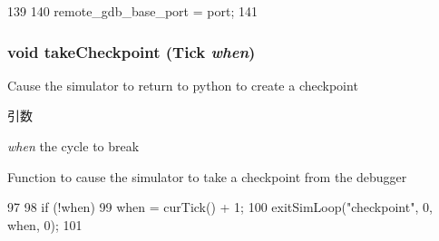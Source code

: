 \begin{DoxyCode}
139 {
140     remote_gdb_base_port = port;
141 }
\end{DoxyCode}
\hypertarget{sim_2debug_8hh_a8e601d5e7c5df79b432e340f3af19583}{
\subsubsection[{takeCheckpoint}]{\setlength{\rightskip}{0pt plus 5cm}void takeCheckpoint ({\bf Tick} {\em when})}}
\label{sim_2debug_8hh_a8e601d5e7c5df79b432e340f3af19583}
Cause the simulator to return to python to create a checkpoint 
\begin{DoxyParams}{引数}
\item[{\em when}]the cycle to break\end{DoxyParams}
Function to cause the simulator to take a checkpoint from the debugger 


\begin{DoxyCode}
97 {
98     if (!when)
99         when = curTick() + 1;
100     exitSimLoop("checkpoint", 0, when, 0);
101 }
\end{DoxyCode}

